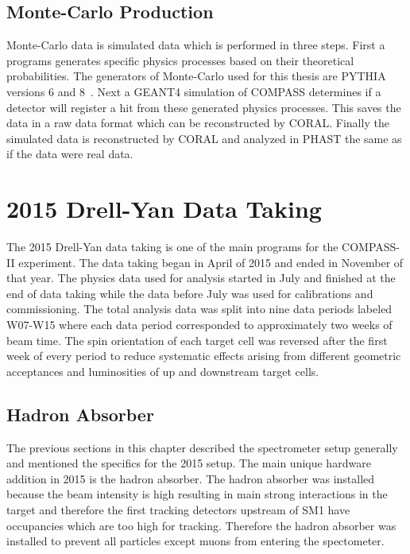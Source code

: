 \subsection{Monte-Carlo Production}
Monte-Carlo data is simulated data which is performed in three steps.  First a
programs generates specific physics processes based on their theoretical
probabilities.  The generators of Monte-Carlo used for this thesis are PYTHIA
versions 6 and 8~\cite{pythia}.  Next a GEANT4 simulation of COMPASS determines
if a detector will register a hit from these generated physics processes.  This
saves the data in a raw data format which can be reconstructed by CORAL.
Finally the simulated data is reconstructed by CORAL and analyzed in PHAST the
same as if the data were real data. \par


\section{2015 Drell-Yan Data Taking}
The 2015 Drell-Yan data taking is one of the main programs for the COMPASS-II
experiment.  The data taking began in April of 2015 and ended in November of
that year.  The physics data used for analysis started in July and finished at
the end of data taking while the data before July was used for calibrations and
commissioning.  The total analysis data was split into nine data periods labeled
W07-W15 where each data period corresponded to approximately two weeks of beam
time. The spin orientation of each target cell was reversed after the first week
of every period to reduce systematic effects arising from different geometric
acceptances and luminosities of up and downstream target cells. \par

\subsection{Hadron Absorber}
The previous sections in this chapter described the spectrometer setup generally
and mentioned the specifics for the 2015 setup.  The main unique hardware
addition in 2015 is the hadron absorber.  The hadron absorber was installed
because the beam intensity is high resulting in main strong interactions in the
target and therefore the first tracking detectors upstream of SM1 have
occupancies which are too high for tracking.  Therefore the hadron absorber was
installed to prevent all particles except muons from entering the spectometer. \par

